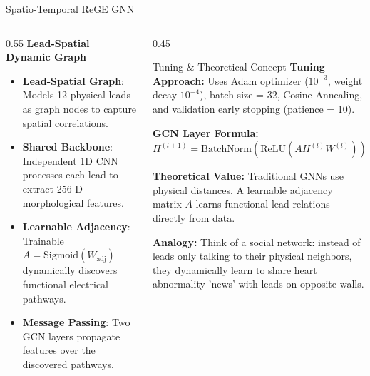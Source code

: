 \documentclass[11pt,aspectratio=169]{beamer}
\begin{document}
\begin{frame}{Spatio-Temporal ReGE GNN}
    \begin{columns}[T]
        \begin{column}{0.55\textwidth}
            \textbf{Lead-Spatial Dynamic Graph}
            \begin{itemize}
                \item \textbf{Lead-Spatial Graph}: Models 12 physical leads as graph nodes to capture spatial correlations.
                \item \textbf{Shared Backbone}: Independent 1D CNN processes each lead to extract 256-D morphological features.
                \item \textbf{Learnable Adjacency}: Trainable $A = \text{Sigmoid}(W_{\text{adj}})$ dynamically discovers functional electrical pathways.
                \item \textbf{Message Passing}: Two GCN layers propagate features over the discovered pathways.
            \end{itemize}
        \end{column}
        \begin{column}{0.45\textwidth}
            \begin{block}{Tuning \& Theoretical Concept}
                \fontsize{8}{9.5}\selectfont
                \textbf{Tuning Approach:} Uses Adam optimizer ($10^{-3}$, weight decay $10^{-4}$), batch size = 32, Cosine Annealing, and validation early stopping (patience = 10).
                \vspace{0.12cm}
                
                \textbf{GCN Layer Formula:}
                \[ H^{(l+1)} = \text{BatchNorm}\left(\text{ReLU}\left(A H^{(l)} W^{(l)}\right)\right) + H^{(l)} \]
                \vspace{0.12cm}
                
                \textbf{Theoretical Value:} Traditional GNNs use physical distances. A learnable adjacency matrix $A$ learns functional lead relations directly from data.
                \vspace{0.12cm}
                
                \textbf{Analogy:} Think of a social network: instead of leads only talking to their physical neighbors, they dynamically learn to share heart abnormality 'news' with leads on opposite walls.
            \end{block}
        \end{column}
    \end{columns}
\end{frame}
\end{document}
